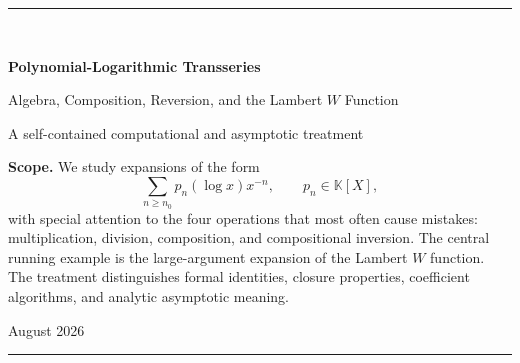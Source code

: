 \documentclass[11pt,oneside]{article}
\numberwithin{equation}{section}
\theoremstyle{definition}
\newcommand{\K}{\mathbb K}
\begin{document}
\hypersetup{pageanchor=false}

\begin{titlepage}
\centering
\vspace*{2.5cm}
{\color{accent}\rule{0.86\textwidth}{1.2pt}}\\[1.2cm]
{\Huge\bfseries\color{ink} Polynomial-Logarithmic Transseries\par}
\vspace{0.45cm}
{\LARGE Algebra, Composition, Reversion, and the Lambert \(W\) Function\par}
\vspace{1.2cm}
{\large A self-contained computational and asymptotic treatment\par}
\vfill
\begin{minipage}{0.82\textwidth}
\small
\textbf{Scope.}  We study expansions of the form
\[
  \sum_{n\ge n_0} p_n(\log x)x^{-n},\qquad p_n\in\K[X],
\]
with special attention to the four operations that most often cause mistakes:
multiplication, division, composition, and compositional inversion.  The central
running example is the large-argument expansion of the Lambert \(W\) function.
The treatment distinguishes formal identities, closure properties, coefficient
algorithms, and analytic asymptotic meaning.
\end{minipage}
\vfill
{\large August 2026\par}
{\color{accent}\rule{0.86\textwidth}{1.2pt}}
\end{titlepage}
\hypersetup{pageanchor=true}
\setcounter{page}{1}

\begin{abstract}
Polynomial-logarithmic transseries are Laurent series in \(x^{-1}\) whose
coefficients are polynomials in \(\ell=\log x\).  They form one of the smallest
useful fragments of the logarithmic-exponential transseries field: small enough
for exact coefficient arithmetic, yet rich enough to express the standard
large-argument expansions of Lambert \(W\), Wright's omega function, inverse
logarithmic perturbations, and many solutions obtained from implicit equations.

This article develops the fragment as a complete filtered algebraic calculus.
We define its rank-two monomial order and truncation topology; prove convolution,
unit, differentiation, antidifferentiation, admissible-composition, and reversion
theorems; derive explicit coefficient recurrences for products, quotients,
near-identity compositions, and inverse series; and compare fixed-point,
triangular, Newton, and Lagrange--B\"urmann inversion algorithms.  Particular
care is given to operations that leave the polynomial-logarithmic ring.  This
leads naturally to rational-log, Laurent-log, Puiseux-log, and iterated-log
enlargements.

For Lambert \(W\), the article derives the complete expansion in Lambert
polynomials, proves their differential-operator, integral-recursion, generating-
function, and Stirling-number descriptions, treats complex branches and the real
branch \(W_{-1}\), and gives numerical and implementation guidance.  Throughout,
``formal'', ``asymptotic'', and ``convergent'' are kept logically separate.
\end{abstract}
\end{document}
